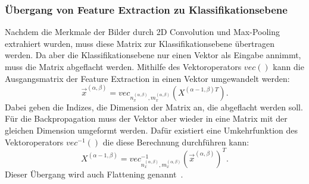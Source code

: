 \documentclass[11pt]{article}
\begin{document}
\subsubsection{Übergang von Feature Extraction zu Klassifikationsebene}
Nachdem die Merkmale der Bilder durch 2D Convolution und Max-Pooling extrahiert wurden, muss diese Matrix zur Klassifikationsebene übertragen werden.
Da aber die Klassifikationsebene nur einen Vektor als Eingabe annimmt, muss die Matrix abgeflacht werden. Mithilfe des Vektoroperators $vec()$ kann die
Ausgangsmatrix der Feature Extraction in einen Vektor umgewandelt werden:
\begin{equation}
    \vec{x}^{(\alpha,\beta)} = vec_{n_{x}^{(\alpha,\beta)}, m_{x}^{(\alpha,\beta)}}(X^{(\alpha-1,\beta)T}).
\end{equation}
Dabei geben die Indizes, die Dimension der Matrix an, die abgeflacht werden soll. Für die Backpropagation muss der Vektor aber wieder in eine Matrix mit
der gleichen Dimension umgeformt werden. Dafür existiert eine Umkehrfunktion des Vektoroperators $vec^{-1}()$ die diese Berechnung durchführen kann:
\begin{equation}
    X^{(\alpha-1,\beta)} = vec^{-1}_{n_{x}^{(\alpha,\beta)}, m_{x}^{(\alpha,\beta)}}{(\vec{x}^{(\alpha,\beta)})}^{T}.
\end{equation}
Dieser Übergang wird auch Flattening genannt~\cite{18}.
\end{document}
